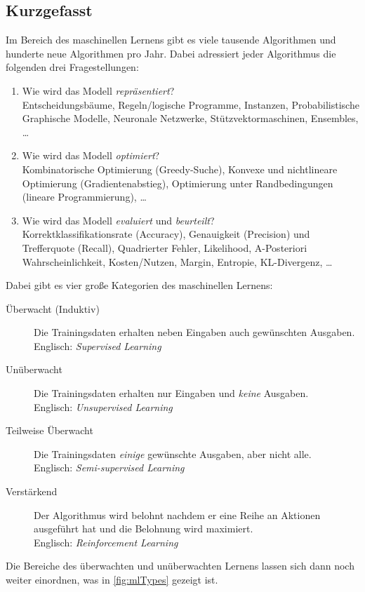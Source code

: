 		\subsection{Kurzgefasst}
			Im Bereich des maschinellen Lernens gibt es viele tausende Algorithmen und hunderte neue Algorithmen pro Jahr. Dabei adressiert jeder Algorithmus die folgenden drei Fragestellungen:
			\begin{enumerate}
				\item Wie wird das Modell \emph{repräsentiert}? \\
					Entscheidungsbäume, Regeln/logische Programme, Instanzen, Probabilistische Graphische Modelle, Neuronale Netzwerke, Stützvektormaschinen, Ensembles, \dots
				\item Wie wird das Modell \emph{optimiert}? \\
					Kombinatorische Optimierung (\zB Greedy-Suche), Konvexe und nichtlineare Optimierung (\zB Gradientenabstieg), Optimierung unter Randbedingungen (\zB lineare Programmierung), \dots
				\item Wie wird das Modell \emph{evaluiert} und \emph{beurteilt}? \\
					Korrektklassifikationsrate (Accuracy), Genauigkeit (Precision) und Trefferquote (Recall), Quadrierter Fehler, Likelihood, A-Posteriori Wahrscheinlichkeit, Kosten/Nutzen, Margin, Entropie, KL-Divergenz, \dots
			\end{enumerate}

			Dabei gibt es vier große Kategorien des maschinellen Lernens:
			\begin{description}
				\item[Überwacht (Induktiv)] Die Trainingsdaten erhalten neben Eingaben auch gewünschten Ausgaben. \\
					Englisch: \emph{Supervised Learning}
				\item[Unüberwacht] Die Trainingsdaten erhalten nur Eingaben und \emph{keine} Ausgaben. \\
					Englisch: \emph{Unsupervised Learning}
				\item[Teilweise Überwacht] Die Trainingsdaten \emph{einige} gewünschte Ausgaben, aber nicht alle. \\
					Englisch: \emph{Semi-supervised Learning}
				\item[Verstärkend] Der Algorithmus wird belohnt nachdem er eine Reihe an Aktionen ausgeführt hat und die Belohnung wird maximiert. \\
					Englisch: \emph{Reinforcement Learning}
			\end{description}
			Die Bereiche des überwachten und unüberwachten Lernens lassen sich dann noch weiter einordnen, was in \autoref{fig:mlTypes} gezeigt ist.


